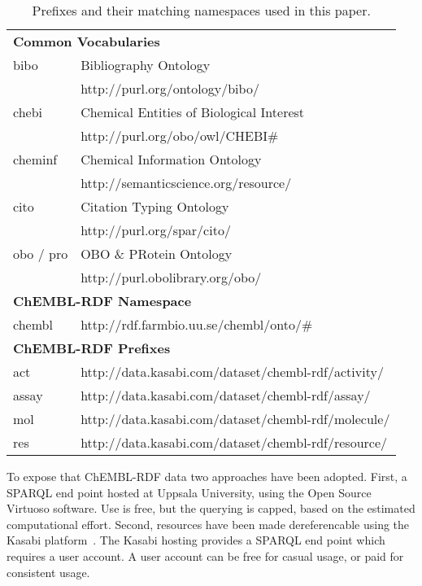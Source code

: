 \documentclass[sw]{iosart2c}
\begin{document}
\begin{table*}
\caption{Prefixes and their matching namespaces used in this paper.} \label{namespaces}
\begin{tabular}{ll}
\hline
\multicolumn{2}{l}{\textbf{Common Vocabularies}} \\
bibo    & Bibliography Ontology~\cite{Giasson2011} \\
        & http://purl.org/ontology/bibo/ \\
chebi   & Chemical Entities of Biological Interest~\cite{DeMatos2010} \\
        & http://purl.org/obo/owl/CHEBI\# \\
cheminf & Chemical Information Ontology~\cite{Hastings2011} \\
        & http://semanticscience.org/resource/ \\
cito    & Citation Typing Ontology~\cite{Shotton2010} \\
        & http://purl.org/spar/cito/ \\
obo / pro & OBO \& PRotein Ontology~\cite{Sidhu2006} \\
          & http://purl.obolibrary.org/obo/ \\

\multicolumn{2}{l}{\textbf{ChEMBL-RDF Namespace}} \\
chembl & http://rdf.farmbio.uu.se/chembl/onto/\# \\

\multicolumn{2}{l}{\textbf{ChEMBL-RDF Prefixes }}\\
act    & http://data.kasabi.com/dataset/chembl-rdf/activity/ \\
assay  & http://data.kasabi.com/dataset/chembl-rdf/assay/ \\
mol    & http://data.kasabi.com/dataset/chembl-rdf/molecule/ \\
res    & http://data.kasabi.com/dataset/chembl-rdf/resource/ \\
\hline
\end{tabular}
\end{table*}

To expose that ChEMBL-RDF data two approaches have been adopted. First, a SPARQL end point
hosted at Uppsala University, using the Open Source Virtuoso software. Use is free, but the
querying is capped, based on the estimated computational effort. Second, resources have
been made dereferencable using the Kasabi platform~\cite{kasabi}. The Kasabi hosting provides a SPARQL
end point which requires a user account. A user account can be free for casual usage, or paid for consistent usage.
\end{document}
